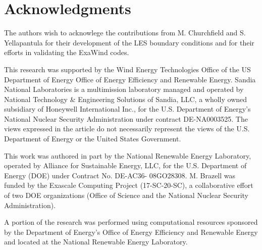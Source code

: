 \documentclass[conf]{new-aiaa}
\begin{document}


\section*{Acknowledgments}

The authors wish to acknowlege the contributions from M. Churchfield
and S. Yellapantula for their development of the LES boundary
conditions and for their efforts in validating the ExaWind codes.

This research was supported by the Wind Energy Technologies Office of
the US Department of Energy Office of Energy Efficiency and Renewable
Energy.  Sandia National Laboratories is a multimission laboratory
managed and operated by National Technology \& Engineering Solutions
of Sandia, LLC, a wholly owned subsidiary of Honeywell International
Inc., for the U.S. Department of Energy's National Nuclear Security
Administration under contract DE-NA0003525. The views expressed in the
article do not necessarily represent the views of the U.S. Department
of Energy or the United States Government.

This work was authored in part by the National Renewable Energy
Laboratory, operated by Alliance for Sustainable Energy, LLC, for the
U.S. Department of Energy (DOE) under Contract No. DE-AC36-
08GO28308. M. Brazell was funded by the Exascale Computing
Project (17-SC-20-SC), a collaborative effort of two DOE organizations
(Office of Science and the National Nuclear Security Administration).

A portion of the research was performed using computational
resources sponsored by the Department of Energy's Office of Energy
Efficiency and Renewable Energy and located at the National Renewable
Energy Laboratory.


\end{document}
